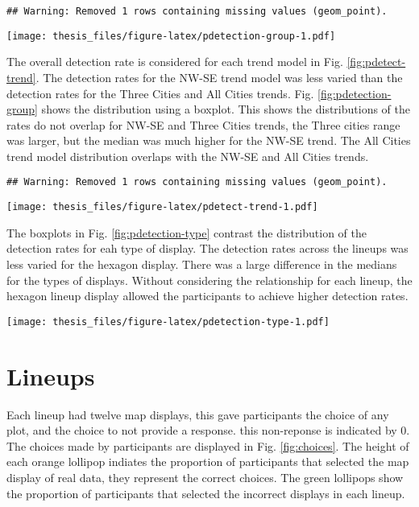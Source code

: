 \documentclass{monashthesis}
\begin{document}
\begin{verbatim}
## Warning: Removed 1 rows containing missing values (geom_point).
\end{verbatim}

\texttt{[image: thesis\_files/figure-latex/pdetection-group-1.pdf]}

The overall detection rate is considered for each trend model in Fig. \ref{fig:pdetect-trend}.
The detection rates for the NW-SE trend model was less varied than the detection rates for the Three Cities and All Cities trends. Fig. \ref{fig:pdetection-group} shows the distribution using a boxplot. This shows the distributions of the rates do not overlap for NW-SE and Three Cities trends, the Three cities range was larger, but the median was much higher for the NW-SE trend. The All Cities trend model distribution overlaps with the NW-SE and All Cities trends.

\begin{verbatim}
## Warning: Removed 1 rows containing missing values (geom_point).
\end{verbatim}

\texttt{[image: thesis\_files/figure-latex/pdetect-trend-1.pdf]}

The boxplots in Fig. \ref{fig:pdetection-type} contrast the distribution of the detection rates for eah type of display.
The detection rates across the lineups was less varied for the hexagon display. There was a large difference in the medians for the types of displays.
Without considering the relationship for each lineup, the hexagon lineup display allowed the participants to achieve higher detection rates.

\texttt{[image: thesis\_files/figure-latex/pdetection-type-1.pdf]}

\hypertarget{lineups}{%
\section{Lineups}\label{lineups}}

Each lineup had twelve map displays, this gave participants the choice of any plot, and the choice to not provide a response. this non-reponse is indicated by 0.
The choices made by participants are displayed in Fig. \ref{fig:choices}. The height of each orange lollipop indiates the proportion of participants that selected the map display of real data, they represent the correct choices.
The green lollipops show the proportion of participants that selected the incorrect displays in each lineup.
\end{document}
